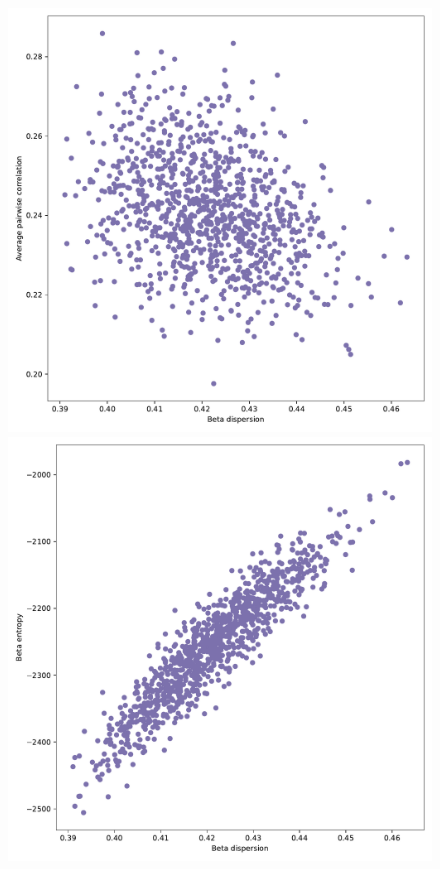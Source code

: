 \documentclass[leqno,12pt]{article}
\begin{document}
{\begin{figure}[htp]
\begin{center}
  \includegraphics[scale=0.33]{img/SampleCovDispersionvsCorrelation1factorsN128T256disp04fvol16minsvol10maxsvol50}
	\includegraphics[scale=0.33]{img/SampleCovDispersionvsEntropy1factorsN128T256disp04fvol16minsvol10maxsvol50}

\end{center}
\end{figure}}
\end{document}
